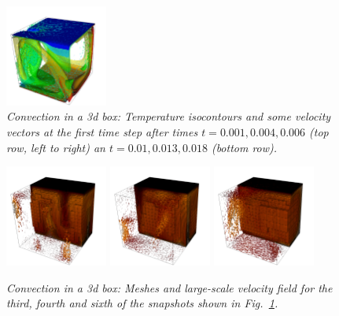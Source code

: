\documentclass{article}
\begin{document}
\begin{figure}
  \hfill
  \includegraphics[width=0.3\textwidth]{cookbooks/convection_box_3d/doc/movie0180.png}
  \caption{\it Convection in a 3d box: Temperature isocontours and some
  velocity vectors at the first time step after times $t=0.001, 0.004, 0.006$
  (top row, left to right) an $t=0.01, 0.013, 0.018$ (bottom row).}
  \label{fig:box-3d-solution}
\end{figure}


\begin{figure}
  \centering
  \includegraphics[width=0.3\textwidth]{cookbooks/convection_box_3d/doc/mesh0060.png}
  \hfill
  \includegraphics[width=0.3\textwidth]{cookbooks/convection_box_3d/doc/mesh0100.png}
  \hfill
  \includegraphics[width=0.3\textwidth]{cookbooks/convection_box_3d/doc/mesh0180.png}
  \caption{\it Convection in a 3d box: Meshes and large-scale velocity field
  for the third, fourth and sixth of the snapshots shown in
  Fig.~\ref{fig:box-3d-solution}.}
  \label{fig:box-3d-mesh}
\end{figure}
\end{document}
